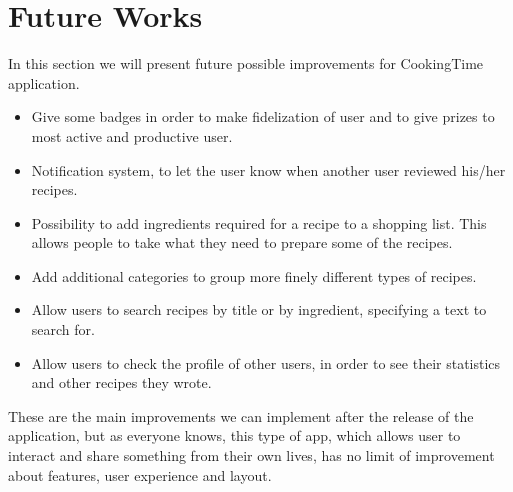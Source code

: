 \chapter{Future Works}
In this section we will present future possible improvements for CookingTime application.
\begin{itemize}
	\item Give some badges in order to make fidelization of user and to give prizes to most active and productive user.
	\item Notification system, to let the user know when another user reviewed his/her recipes. 
	\item Possibility to add ingredients required for a recipe to a shopping list. This allows people to take what they need to prepare some of the recipes.
	\item Add additional categories to group more finely different types of recipes.
	\item Allow users to search recipes by title or by ingredient, specifying a text to search for.
	\item Allow users to check the profile of other users, in order to see their statistics and other recipes they wrote.
\end{itemize}
These are the main improvements we can implement after the release of the application, but as everyone knows, this type of app, which allows user to interact and share something from their own lives, has no limit of improvement about features, user experience and layout.
